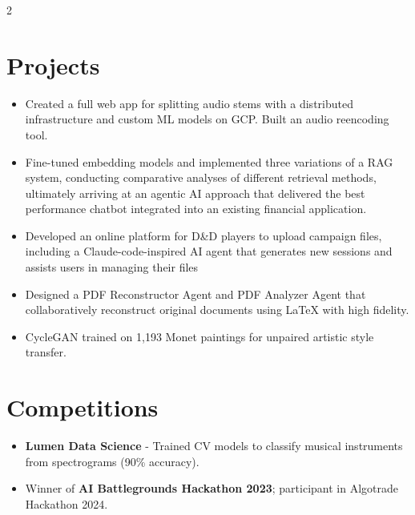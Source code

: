 \documentclass[a4paper,10pt]{article}
\begin{document}
\begin{paracol}{2}
\vspace{4mm}

\section*{Projects}

\begin{itemize}

    \item Created a full web app for splitting audio stems with a distributed infrastructure and custom ML models on GCP. Built an audio reencoding tool.

    \item Fine-tuned embedding models and implemented three variations of a RAG system, conducting comparative analyses of different retrieval methods, ultimately arriving at an agentic AI approach that delivered the best performance chatbot integrated into an existing financial application.

    \item Developed an online platform for D\&D players to upload campaign files, including a Claude-code-inspired AI agent that generates new sessions and assists users in managing their files

    \item Designed a PDF Reconstructor Agent and PDF Analyzer Agent that collaboratively reconstruct original documents using LaTeX with high fidelity.

    \item CycleGAN trained on 1,193 Monet paintings for unpaired artistic style transfer.

\end{itemize}

\vspace{4mm}

\section*{Competitions}

\begin{itemize}

     \item \textbf{Lumen Data Science} - Trained CV models to classify musical instruments from spectrograms (90\% accuracy).

    \item Winner of \textbf{AI Battlegrounds Hackathon 2023}; participant in Algotrade Hackathon 2024.


\end{itemize}
\end{paracol}
\end{document}
